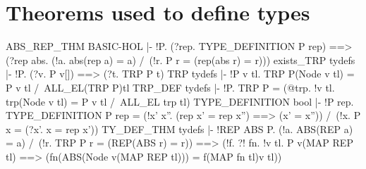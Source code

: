 \section{Theorems used to define types}
\THEOREM ABS\_REP\_THM BASIC-HOL
|- !P.
    (?rep. TYPE_DEFINITION P rep) ==>
    (?rep abs. (!a. abs(rep a) = a) /\ (!r. P r = (rep(abs r) = r)))
\ENDTHEOREM
\THEOREM exists\_TRP tydefs
|- !P. (?v. P v[]) ==> (?t. TRP P t)
\ENDTHEOREM
\THEOREM TRP tydefs
|- !P v tl. TRP P(Node v tl) = P v tl /\ ALL_EL(TRP P)tl
\ENDTHEOREM
\THEOREM TRP\_DEF tydefs
|- !P. TRP P = (@trp. !v tl. trp(Node v tl) = P v tl /\ ALL_EL trp tl)
\ENDTHEOREM
\THEOREM TYPE\_DEFINITION bool
|- !P rep.
    TYPE_DEFINITION P rep =
    (!x' x''. (rep x' = rep x'') ==> (x' = x'')) /\
    (!x. P x = (?x'. x = rep x'))
\ENDTHEOREM
\THEOREM TY\_DEF\_THM tydefs
|- !REP ABS P.
    (!a. ABS(REP a) = a) /\ (!r. TRP P r = (REP(ABS r) = r)) ==>
    (!f.
      ?! fn.
       !v tl.
        P v(MAP REP tl) ==>
        (fn(ABS(Node v(MAP REP tl))) = f(MAP fn tl)v tl))
\ENDTHEOREM
